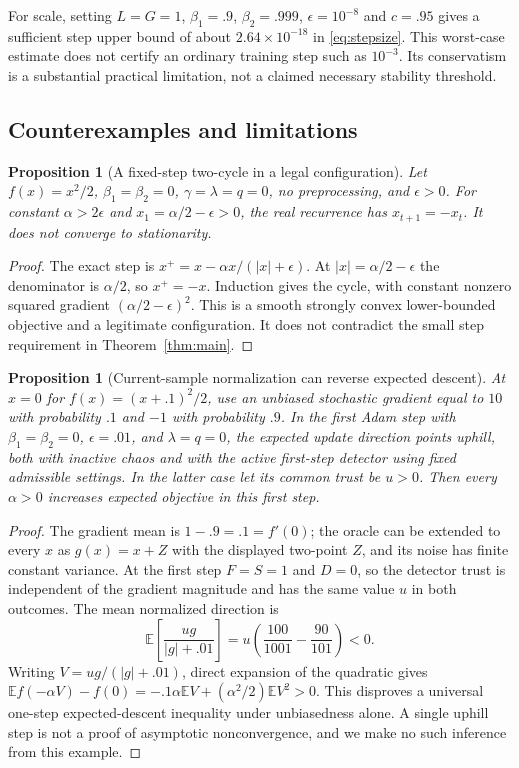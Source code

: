 \documentclass[11pt,a4paper]{article}
\newtheorem{proposition}[theorem]{Proposition}
\theoremstyle{definition}
\theoremstyle{remark}
\newcommand{\E}{\mathbb E}
\begin{document}
For scale, setting $L=G=1$, $\beta_1=.9$, $\beta_2=.999$,
$\epsilon=10^{-8}$ and $c=.95$ gives a sufficient step upper bound of about
$2.64\times10^{-18}$ in \eqref{eq:stepsize}. This worst-case estimate does not
certify an ordinary training step such as $10^{-3}$. Its conservatism is a
substantial practical limitation, not a claimed necessary stability threshold.

\subsection{Counterexamples and limitations}\label{sec:counterexamples}
\begin{proposition}[A fixed-step two-cycle in a legal configuration]\label{prop:cycle}
Let $f(x)=x^2/2$, $\beta_1=\beta_2=0$, $\gamma=\lambda=q=0$, no
preprocessing, and $\epsilon>0$. For constant $\alpha>2\epsilon$ and
$x_1=\alpha/2-\epsilon>0$, the real recurrence has $x_{t+1}=-x_t$.
It does not converge to stationarity.
\end{proposition}
\begin{proof}
The exact step is $x^+=x-\alpha x/(|x|+\epsilon)$. At
$|x|=\alpha/2-\epsilon$ the denominator is $\alpha/2$, so $x^+=-x$.
Induction gives the cycle, with constant nonzero squared gradient
$(\alpha/2-\epsilon)^2$. This is a smooth strongly convex lower-bounded
objective and a legitimate configuration. It does not contradict the small
step requirement in Theorem~\ref{thm:main}.
\end{proof}

\begin{proposition}[Current-sample normalization can reverse expected descent]\label{prop:bias}
At $x=0$ for $f(x)=(x+.1)^2/2$, use an unbiased stochastic gradient equal to
$10$ with probability $.1$ and $-1$ with probability $.9$. In the first Adam
step with $\beta_1=\beta_2=0$, $\epsilon=.01$, and $\lambda=q=0$, the expected
update direction points uphill, both with inactive chaos and with the active
first-step detector using fixed admissible settings. In the latter case let
its common trust be $u>0$. Then every $\alpha>0$ increases expected objective
in this first step.
\end{proposition}
\begin{proof}
The gradient mean is $1-.9=.1=f'(0)$; the oracle can be extended to every $x$
as $g(x)=x+Z$ with the displayed two-point $Z$, and its noise has finite
constant variance. At the first step $F=S=1$ and $D=0$, so the detector trust
is independent of the gradient magnitude and has the same value $u$ in both
outcomes. The mean normalized direction is
\[
 \E\left[\frac{u g}{|g|+.01}\right]
 =u\left(\frac{100}{1001}-\frac{90}{101}\right)<0.
\]
Writing $V=ug/(|g|+.01)$, direct expansion of the quadratic gives
$\E f(-\alpha V)-f(0)=-.1\alpha\E V+(\alpha^2/2)\E V^2>0$.
This disproves a universal one-step expected-descent inequality under
unbiasedness alone. A single uphill step is not a proof of asymptotic
nonconvergence, and we make no such inference from this example.
\end{proof}
\end{document}
